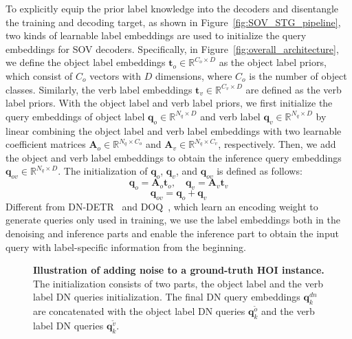 \documentclass[10pt,twocolumn,letterpaper]{article}
\begin{document}
\label{sec:split_label_embedding}
\quad To explicitly equip the prior label knowledge into the decoders and disentangle the training and decoding target,
as shown in Figure~\ref{fig:SOV_STG_pipeline}, two kinds of learnable label embeddings are used to initialize the query embeddings for SOV decoders.
Specifically, in Figure~\ref{fig:overall_architecture}, we define the object label embeddings $\bm{t}_o\in \mathbb{R}^{C_o\times D}$ as the object label priors, which consist of $C_o$ vectors with $D$ dimensions, where $C_o$ is the number of object classes.
Similarly, the verb label embeddings $\bm{t}_v\in \mathbb{R}^{C_v\times D}$ are defined as the verb label priors.
With the object label and verb label priors, we first initialize the query embeddings of object label $\bm{q}_o\in\mathbb{R}^{N_q\times D}$ and verb label $\bm{q}_v\in\mathbb{R}^{N_q\times D}$ by linear combining the object label and verb label embeddings with two learnable coefficient matrices $\bm{A}_o\in\mathbb{R}^{N_q\times C_o}$ and $\bm{A}_v\in\mathbb{R}^{N_q\times C_v}$, respectively.
Then, we add the object and verb label embeddings to obtain the inference query embeddings $\bm{q}_{ov}\in \mathbb{R}^{N_q \times D}$.
The initialization of $\bm{q}_o$, $\bm{q}_v$, and $\bm{q}_{ov}$ is defined as follows:
\begin{equation}
    \bm{q}_o = \bm{A}_o \bm{t}_o, \quad \bm{q}_v = \bm{A}_v \bm{t}_v
\end{equation}
\begin{equation}
    \bm{q}_{ov} = \bm{q}_o + \bm{q}_v
\end{equation}
Different from DN-DETR~\cite{Li_2022_CVPR} and DOQ~\cite{qu2022distillation}, which learn an encoding weight to generate queries only used in training,
we use the label embeddings both in the denoising and inference parts and enable the inference part to obtain the input query with label-specific information from the beginning.

\begin{figure}[!t]
  \centering
  \caption{
      \textbf{Illustration of adding noise to a ground-truth HOI instance.}
      The initialization consists of two parts, the object label and the verb label DN queries initialization.
      The final DN query embeddings $\bm{q}^{dn}_{k}$ are concatenated with the object label DN queries $\bm{q}^{\tilde{o}}_{k}$ and the verb label DN queries $\bm{q}^{\tilde{v}}_{k}$.
}
\label{fig:dn_query_init}
\end{figure}
\end{document}
